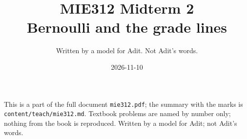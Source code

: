 
\title{MIE312 Midterm 2\\[0.3em]\large Bernoulli and the grade lines}
\author{Written by a model for Adit. Not Adit's words.}
\date{2026-11-10}

\maketitle
\begin{sloppypar}\noindent\small This is a part of the full document \texttt{mie312.pdf}; the summary with the marks is \texttt{content/teach/mie312.md}. Textbook problems are named by number only; nothing from the book is reproduced. Written by a model for Adit; not Adit's words.\normalsize\end{sloppypar}



